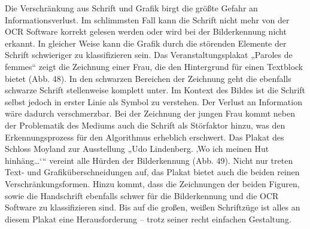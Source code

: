 \documentclass[a4paper,12pt,ngerman]{article}
\begin{document}
Die Verschränkung aus Schrift und Grafik birgt die größte Gefahr an Informationsverlust. Im schlimmsten Fall kann die Schrift nicht mehr von der OCR Software korrekt gelesen werden oder wird bei der Bilderkennung nicht erkannt. In gleicher Weise kann die Grafik durch die störenden Elemente der Schrift schwieriger zu klassifizieren sein. Das Veranstaltungsplakat „Paroles de femmes“ zeigt die Zeichnung einer Frau, die den Hintergrund für einen Textblock bietet (Abb. 48). In den schwarzen Bereichen der Zeichnung geht die ebenfalls schwarze Schrift stellenweise komplett unter. Im Kontext des Bildes ist die Schrift selbst jedoch in erster Linie als Symbol zu verstehen. Der Verlust an Information wäre dadurch verschmerzbar. Bei der Zeichnung der jungen Frau kommt neben der Problematik des Mediums auch die Schrift als Störfaktor hinzu, was den Erkennungsprozess für den Algorithmus erheblich erschwert. Das Plakat des Schloss Moyland zur Ausstellung „Udo Lindenberg. ‚Wo ich meinen Hut hinhäng…‘“ vereint alle Hürden der Bilderkennung (Abb. 49). Nicht nur treten Text- und Grafiküberschneidungen auf, das Plakat bietet auch die beiden reinen Verschränkungsformen. Hinzu kommt, dass die Zeichnungen der beiden Figuren, sowie die Handschrift ebenfalls schwer für die Bilderkennung und die OCR Software zu klassifizieren sind. Bis auf die großen, weißen Schriftzüge ist alles an diesem Plakat eine Herausforderung -- trotz seiner recht einfachen Gestaltung.
\end{document}
